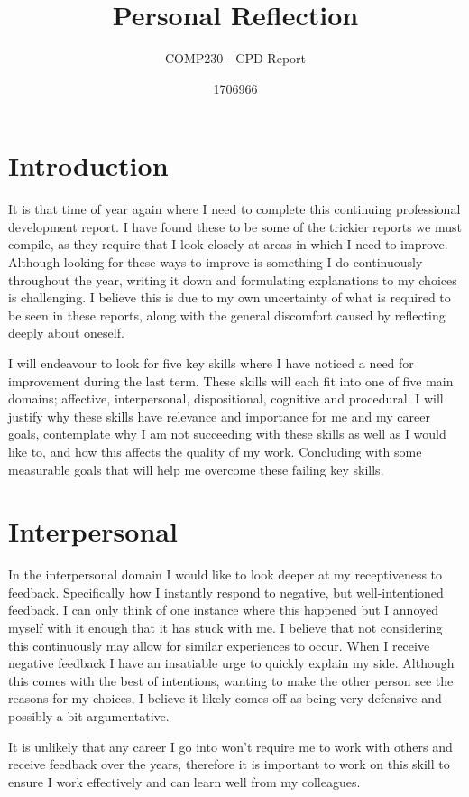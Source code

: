 \documentclass{scrartcl}
\title{Personal Reflection}
\subtitle{COMP230 - CPD Report}
\author{1706966}
\begin{document}
\maketitle

\section{Introduction}
It is that time of year again where I need to complete this continuing professional development report. I have found these to be some of the trickier reports we must compile, as they require that I look closely at areas in which I need to improve. Although looking for these ways to improve is something I do continuously throughout the year, writing it down and formulating explanations to my choices is challenging. I believe this is due to my own uncertainty of what is required to be seen in these reports, along with the general discomfort caused by reflecting deeply about oneself.

I will endeavour to look for five key skills where I have noticed a need for improvement during the last term. These skills will each fit into one of five main domains; affective, interpersonal, dispositional, cognitive and procedural. I will justify why these skills have relevance and importance for me and my career goals, contemplate why I am not succeeding with these skills as well as I would like to, and how this affects the quality of my work. Concluding with some measurable goals that will help me overcome these failing key skills.

\section{Interpersonal}
In the interpersonal domain I would like to look deeper at my receptiveness to feedback. Specifically how I instantly respond to negative, but well-intentioned feedback. I can only think of one instance where this happened but I annoyed myself with it enough that it has stuck with me. I believe that not considering this continuously may allow for similar experiences to occur. When I receive negative feedback I have an insatiable urge to quickly explain my side. Although this comes with the best of intentions, wanting to make the other person see the reasons for my choices, I believe it likely comes off as being very defensive and possibly a bit argumentative. 

It is unlikely that any career I go into won't require me to work with others and receive feedback over the years, therefore it is important to work on this skill to ensure I work effectively and can learn well from my colleagues.
\end{document}
